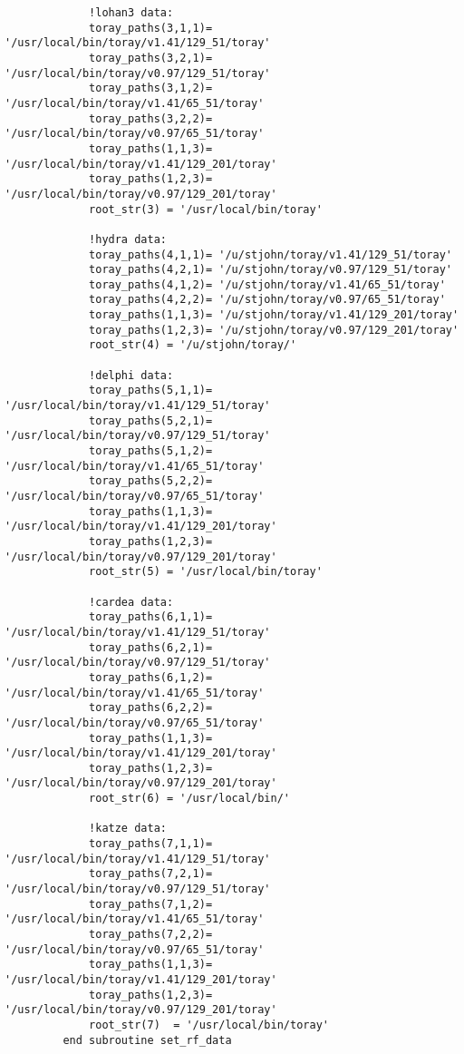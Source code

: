 \documentclass[12pt]{article}
\begin{document}
\begin{verbatim}
             !lohan3 data:
             toray_paths(3,1,1)= '/usr/local/bin/toray/v1.41/129_51/toray'
             toray_paths(3,2,1)= '/usr/local/bin/toray/v0.97/129_51/toray' 
             toray_paths(3,1,2)= '/usr/local/bin/toray/v1.41/65_51/toray'
             toray_paths(3,2,2)= '/usr/local/bin/toray/v0.97/65_51/toray'
             toray_paths(1,1,3)= '/usr/local/bin/toray/v1.41/129_201/toray'
             toray_paths(1,2,3)= '/usr/local/bin/toray/v0.97/129_201/toray'   
             root_str(3) = '/usr/local/bin/toray' 

             !hydra data:
             toray_paths(4,1,1)= '/u/stjohn/toray/v1.41/129_51/toray'
             toray_paths(4,2,1)= '/u/stjohn/toray/v0.97/129_51/toray' 
             toray_paths(4,1,2)= '/u/stjohn/toray/v1.41/65_51/toray'
             toray_paths(4,2,2)= '/u/stjohn/toray/v0.97/65_51/toray' 
             toray_paths(1,1,3)= '/u/stjohn/toray/v1.41/129_201/toray'
             toray_paths(1,2,3)= '/u/stjohn/toray/v0.97/129_201/toray' 
             root_str(4) = '/u/stjohn/toray/' 

             !delphi data:
             toray_paths(5,1,1)= '/usr/local/bin/toray/v1.41/129_51/toray'
             toray_paths(5,2,1)= '/usr/local/bin/toray/v0.97/129_51/toray' 
             toray_paths(5,1,2)= '/usr/local/bin/toray/v1.41/65_51/toray'
             toray_paths(5,2,2)= '/usr/local/bin/toray/v0.97/65_51/toray'
             toray_paths(1,1,3)= '/usr/local/bin/toray/v1.41/129_201/toray'
             toray_paths(1,2,3)= '/usr/local/bin/toray/v0.97/129_201/toray'   
             root_str(5) = '/usr/local/bin/toray' 

             !cardea data:
             toray_paths(6,1,1)= '/usr/local/bin/toray/v1.41/129_51/toray'
             toray_paths(6,2,1)= '/usr/local/bin/toray/v0.97/129_51/toray' 
             toray_paths(6,1,2)= '/usr/local/bin/toray/v1.41/65_51/toray'
             toray_paths(6,2,2)= '/usr/local/bin/toray/v0.97/65_51/toray'
             toray_paths(1,1,3)= '/usr/local/bin/toray/v1.41/129_201/toray'
             toray_paths(1,2,3)= '/usr/local/bin/toray/v0.97/129_201/toray'  
             root_str(6) = '/usr/local/bin/' 

             !katze data:
             toray_paths(7,1,1)= '/usr/local/bin/toray/v1.41/129_51/toray'
             toray_paths(7,2,1)= '/usr/local/bin/toray/v0.97/129_51/toray' 
             toray_paths(7,1,2)= '/usr/local/bin/toray/v1.41/65_51/toray'
             toray_paths(7,2,2)= '/usr/local/bin/toray/v0.97/65_51/toray'
             toray_paths(1,1,3)= '/usr/local/bin/toray/v1.41/129_201/toray'
             toray_paths(1,2,3)= '/usr/local/bin/toray/v0.97/129_201/toray'  
             root_str(7)  = '/usr/local/bin/toray' 
         end subroutine set_rf_data

         \end{verbatim}
\end{document}

